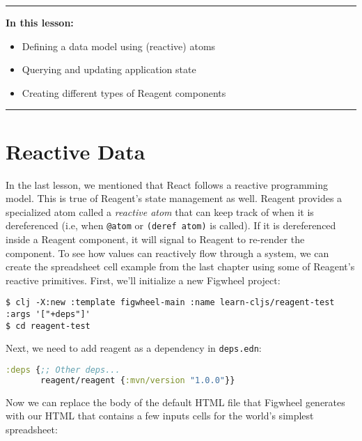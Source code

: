 \documentclass[10pt,twoside,openright]{memoir}
\begin{document}
\begin{center}\rule{0.5\linewidth}{0.5pt}\end{center}

\textbf{In this lesson:}

\begin{itemize}
\tightlist
\item
  Defining a data model using (reactive) atoms
\item
  Querying and updating application state
\item
  Creating different types of Reagent components
\end{itemize}

\begin{center}\rule{0.5\linewidth}{0.5pt}\end{center}


\section{Reactive Data}

In the last lesson, we mentioned that React follows a reactive
programming model. This is true of Reagent's state management as well.
Reagent provides a specialized atom called a \emph{reactive atom} that
can keep track of when it is dereferenced (i.e, when \texttt{@atom} or
\texttt{(deref\ atom)} is called). If it is dereferenced inside a
Reagent component, it will signal to Reagent to re-render the component.
To see how values can reactively flow through a system, we can create
the spreadsheet cell example from the last chapter using some of
Reagent's reactive primitives. First, we'll initialize a new Figwheel
project:

\begin{verbatim}
$ clj -X:new :template figwheel-main :name learn-cljs/reagent-test :args '["+deps"]'
$ cd reagent-test
\end{verbatim}

Next, we need to add reagent as a dependency in \texttt{deps.edn}:

\begin{lstlisting}[language=Clojure, caption={deps.edn}]
:deps {;; Other deps...
       reagent/reagent {:mvn/version "1.0.0"}}
\end{lstlisting}

Now we can replace the body of the default HTML file that Figwheel
generates with our HTML that contains a few inputs cells for the world's
simplest spreadsheet:
\end{document}

